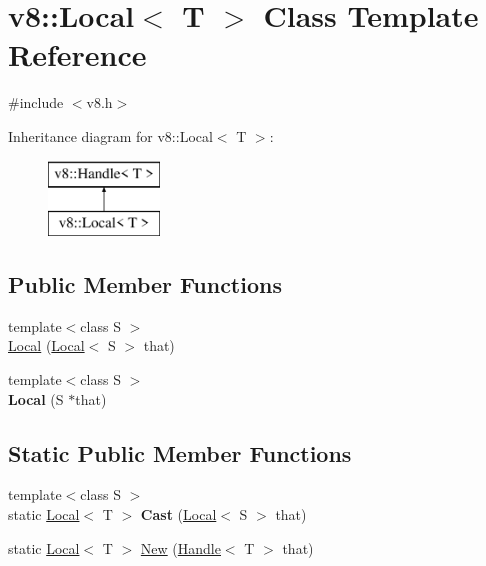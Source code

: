 \hypertarget{classv8_1_1_local}{}\section{v8\+:\+:Local$<$ T $>$ Class Template Reference}
\label{classv8_1_1_local}


{\ttfamily \#include $<$v8.\+h$>$}

Inheritance diagram for v8\+:\+:Local$<$ T $>$\+:\begin{figure}[H]
\begin{center}
\leavevmode
\includegraphics[height=2.000000cm]{classv8_1_1_local}
\end{center}
\end{figure}
\subsection*{Public Member Functions}
\begin{DoxyCompactItemize}
\item 
{\footnotesize template$<$class S $>$ }\\\hyperlink{classv8_1_1_local_af7cf8d2fe7e10a14ad382189712adaff}{Local} (\hyperlink{classv8_1_1_local}{Local}$<$ S $>$ that)
\item 
\hypertarget{classv8_1_1_local_aaa90419a2288a960d4a139ff226914b2}{}{\footnotesize template$<$class S $>$ }\\{\bfseries Local} (S $\ast$that)\label{classv8_1_1_local_aaa90419a2288a960d4a139ff226914b2}

\end{DoxyCompactItemize}
\subsection*{Static Public Member Functions}
\begin{DoxyCompactItemize}
\item 
\hypertarget{classv8_1_1_local_a8e76791c0614ec0feed0e5a3a9d6e9f8}{}{\footnotesize template$<$class S $>$ }\\static \hyperlink{classv8_1_1_local}{Local}$<$ T $>$ {\bfseries Cast} (\hyperlink{classv8_1_1_local}{Local}$<$ S $>$ that)\label{classv8_1_1_local_a8e76791c0614ec0feed0e5a3a9d6e9f8}

\item 
static \hyperlink{classv8_1_1_local}{Local}$<$ T $>$ \hyperlink{classv8_1_1_local_ac4024a7e2aea140c6aaa38fc32d5a840}{New} (\hyperlink{classv8_1_1_handle}{Handle}$<$ T $>$ that)
\end{DoxyCompactItemize}


